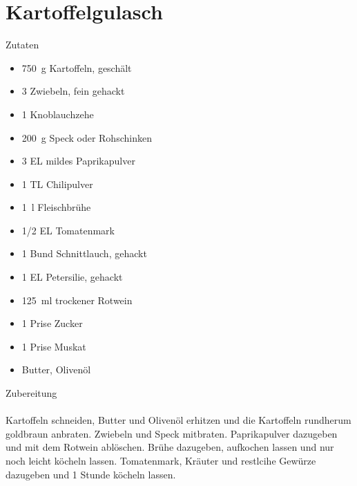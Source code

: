 \section*{Kartoffelgulasch}
\ihead{}\ohead{}
\cfoot{}
{\Large Zutaten}
\begin{multicols}{2}
\begin{itemize}
    \item \SI{750}{g} Kartoffeln, geschält
    \item \num{3} Zwiebeln, fein gehackt
    \item \num{1} Knoblauchzehe
    \item \SI{200}{g} Speck oder Rohschinken
    \item \num{3} EL mildes Paprikapulver
    \item \num{1} TL Chilipulver
    \item \SI{1}{l} Fleischbrühe
    \item \num{1/2} EL Tomatenmark
    \item \num{1} Bund Schnittlauch, gehackt
    \item \num{1} EL Petersilie, gehackt
    \item \SI{125}{ml} trockener Rotwein
    \item \num{1} Prise Zucker
    \item \num{1} Prise Muskat
    \item Butter, Olivenöl
\end{itemize}
\end{multicols}
\noindent
{\Large Zubereitung}\\
\\
Kartoffeln schneiden, Butter und Olivenöl erhitzen und die Kartoffeln rundherum goldbraun anbraten.
Zwiebeln und Speck mitbraten.
Paprikapulver dazugeben und mit dem Rotwein ablöschen.
Brühe dazugeben, aufkochen lassen und nur noch leicht köcheln lassen.
Tomatenmark, Kräuter und restlcihe Gewürze dazugeben und \num{1} Stunde köcheln lassen.